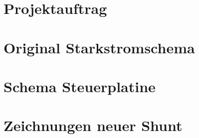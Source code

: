 \chapter{Projektauftrag}





\chapter{Original Starkstromschema}\label{schema_original}


\chapter{Schema Steuerplatine}\label{Anh_Steuerplatine}



\chapter{Zeichnungen neuer Shunt}


